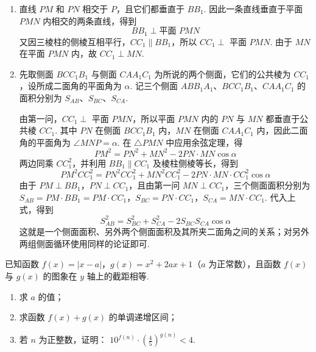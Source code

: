 \begin{solution}
\begin{enumerate}
\item 直线 \(PM\) 和 \(PN\) 相交于 \(P\)，且它们都垂直于 \(BB_1\). 因此一条直线垂直于平面 \(PMN\) 内相交的两条直线，得到
\[
BB_1\perp\text{平面 }PMN
\]
又因三棱柱的侧棱互相平行，\(CC_1\parallel BB_1\)，所以 \(CC_1\perp\) 平面 \(PMN\). 由于 \(MN\) 在平面 \(PMN\) 内，故 \(CC_1\perp MN\).

\item 先取侧面 \(BCC_1B_1\) 与侧面 \(CAA_1C_1\) 为所说的两个侧面，它们的公共棱为 \(CC_1\)，设所成二面角的平面角为 \(\alpha\). 记三个侧面 \(ABB_1A_1\)、\(BCC_1B_1\)、\(CAA_1C_1\) 的面积分别为 \(S_{AB}\)、\(S_{BC}\)、\(S_{CA}\).

由第一问，\(CC_1\perp\) 平面 \(PMN\)，所以平面 \(PMN\) 内的 \(PN\) 与 \(MN\) 都垂直于公共棱 \(CC_1\). 其中 \(PN\) 在侧面 \(BCC_1B_1\) 内，\(MN\) 在侧面 \(CAA_1C_1\) 内，因此二面角的平面角为 \(\angle MNP=\alpha\). 在 \(\triangle PMN\) 中应用余弦定理，得
\[
PM^2=PN^2+MN^2-2PN\cdot MN\cos\alpha
\]
两边同乘 \(CC_1^2\)，并利用 \(BB_1\parallel CC_1\) 及棱柱侧棱等长，得到
\[
PM^2CC_1^2=PN^2CC_1^2+MN^2CC_1^2-2PN\cdot MN\cdot CC_1^2\cos\alpha
\]
由于 \(PM\perp BB_1\)，\(PN\perp CC_1\)，且由第一问 \(MN\perp CC_1\)，三个侧面面积分别为
\(S_{AB}=PM\cdot BB_1=PM\cdot CC_1\)，\(S_{BC}=PN\cdot CC_1\)，\(S_{CA}=MN\cdot CC_1\).
代入上式，得到
\[
S_{AB}^2=S_{BC}^2+S_{CA}^2-2S_{BC}S_{CA}\cos\alpha
\]
这就是一个侧面面积、另外两个侧面面积及其所夹二面角之间的关系；对另外两组侧面循环使用同样的论证即可.
\end{enumerate}
\end{solution}

\begin{problem}
已知函数 \(f(x)=|x-a|\)，\(g(x)=x^2+2ax+1\)（\(a\) 为正常数），且函数 \(f(x)\) 与 \(g(x)\) 的图象在 \(y\) 轴上的截距相等.

\begin{enumerate}
\item 求 \(a\) 的值；
\item 求函数 \(f(x)+g(x)\) 的单调递增区间；
\item 若 \(n\) 为正整数，证明： \(10^{f(n)}\cdot\left(\frac45\right)^{g(n)}<4\).
\end{enumerate}
\end{problem}

